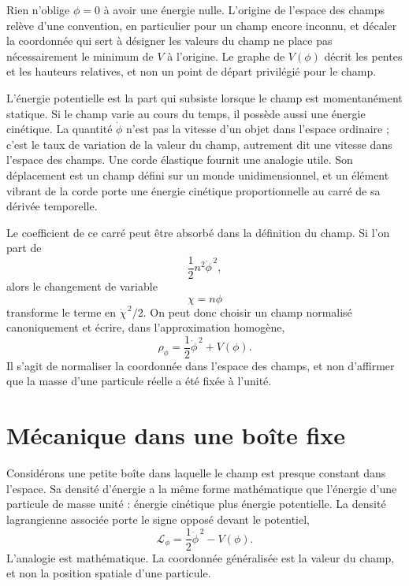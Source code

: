 Rien n’oblige \(\phi=0\) à avoir une énergie nulle. L’origine de l’espace des champs relève d’une convention, en particulier pour un champ encore inconnu, et décaler la coordonnée qui sert à désigner les valeurs du champ ne place pas nécessairement le minimum de \(V\) à l’origine. Le graphe de \(V(\phi)\) décrit les pentes et les hauteurs relatives, et non un point de départ privilégié pour le champ.

L’énergie potentielle est la part qui subsiste lorsque le champ est momentanément statique. Si le champ varie au cours du temps, il possède aussi une énergie cinétique. La quantité \(\dot\phi\) n’est pas la vitesse d’un objet dans l’espace ordinaire ; c’est le taux de variation de la valeur du champ, autrement dit une vitesse dans l’espace des champs. Une corde élastique fournit une analogie utile. Son déplacement est un champ défini sur un monde unidimensionnel, et un élément vibrant de la corde porte une énergie cinétique proportionnelle au carré de sa dérivée temporelle.

Le coefficient de ce carré peut être absorbé dans la définition du champ. Si l’on part de
\begin{equation}
\frac12 n^2\dot\phi^{\,2},
\end{equation}
alors le changement de variable
\begin{equation}
\chi=n\phi
\end{equation}
transforme le terme en \(\dot\chi^{\,2}/2\). On peut donc choisir un champ normalisé canoniquement et écrire, dans l’approximation homogène,
\begin{equation}
\rho_\phi=\frac12\dot\phi^{\,2}+V(\phi).
\label{eq:c09-rho-homogeneous}
\end{equation}
Il s’agit de normaliser la coordonnée dans l’espace des champs, et non d’affirmer que la masse d’une particule réelle a été fixée à l’unité.

\section{Mécanique dans une boîte fixe}

Considérons une petite boîte dans laquelle le champ est presque constant dans l’espace. Sa densité d’énergie a la même forme mathématique que l’énergie d’une particule de masse unité : énergie cinétique plus énergie potentielle. La densité lagrangienne associée porte le signe opposé devant le potentiel,
\begin{equation}
\mathcal L_\phi
=\frac12\dot\phi^{\,2}-V(\phi).
\label{eq:c09-lagrangian-density}
\end{equation}
L’analogie est mathématique. La coordonnée généralisée est la valeur du champ, et non la position spatiale d’une particule.

